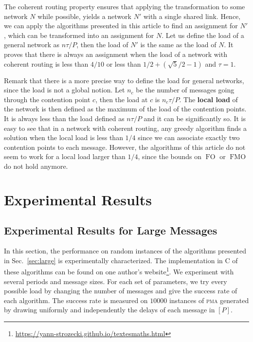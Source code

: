 \documentclass[a4paper,UKenglish,cleveref, autoref, thm-restate]{lipics-v2019}
\DeclareMathOperator{\Fo}{FO}
\DeclareMathOperator{\Fmo}{FMO}
\newcommand\pma{\textsc{pma}\xspace}
\begin{document}
The coherent routing property ensures that applying the transformation to some network $N$ while possible, yields a network $N'$ with a single shared link. Hence, we can apply the algorithms presented in this article to find an assignment for $N'$, which can be transformed into an assignment for $N$. Let us define the load of a general network as $n\tau /P$, then the load of $N'$ is the same as the load of $N$. It proves that there is always an assignment when the load of a network with coherent routing is less than $4/10$ or less than $1/2 + (\sqrt{5}/2 -1)$ and $\tau = 1$. 

Remark that there is a more precise way to define the load for general networks, since the load is not a global notion. 
Let $n_c$ be the number of messages going through the contention point $c$, then the load at $c$ is $n_c\tau/P$. The \textbf{local load} of the network is then defined as the maximum
of the load of the contention points. It is always less than the load defined as $n\tau /P$ and it can be significantly so.
It is easy to see that in a network with coherent routing, any greedy algorithm finds a solution when the local load is less than $1/4$ since we can associate 
exactly two contention points to each message. However, the algorithms of this article do not seem to work for a local load larger than $1/4$, since the bounds on $\Fo$ or $\Fmo$ do not hold anymore. 




\section{Experimental Results}


\subsection{Experimental Results for Large Messages} \label{sec:perf_large}


In this section, the performance on random instances of the algorithms presented in Sec.~\ref{sec:large} is experimentally characterized. The implementation in C of these algorithms can be found on one author's website\footnote{\url{https://yann-strozecki.github.io/textesmaths.html}}. We experiment with several periods and message sizes. For each set of parameters, we try every possible load by changing the number of messages and give the success rate of each algorithm. The success rate is measured on $10000$ instances of \pma generated by drawing uniformly and independently the delays of each message in $[P]$. 
\end{document}
